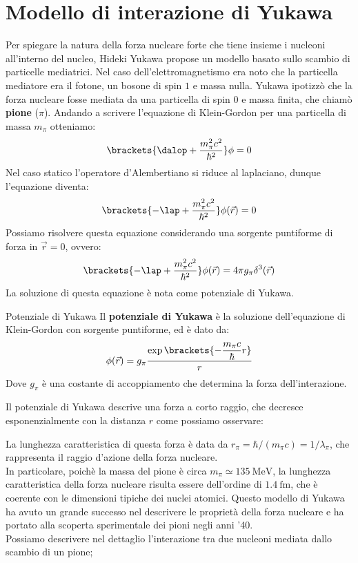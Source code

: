 \section{Modello di interazione di Yukawa}
Per spiegare la natura della forza nucleare forte che tiene insieme i nucleoni all'interno del nucleo, Hideki Yukawa propose un modello basato sullo scambio di particelle mediatrici. Nel caso dell'elettromagnetismo era noto che la particella mediatore era il fotone, un bosone di spin $1$ e massa nulla. Yukawa ipotizzò che la forza nucleare fosse mediata da una particella di spin $0$ e massa finita, che chiamò \textbf{pione} ($\pi$). Andando a scrivere l'equazione di Klein-Gordon per una particella di massa $m_{\pi}$ otteniamo:
\begin{equation}
    \brackets{\dalop + \dfrac{m_{\pi}^2 c^2}{\hbar^2}} \phi = 0
\end{equation}
Nel caso statico l'operatore d'Alembertiano si riduce al laplaciano, dunque l'equazione diventa:
\begin{equation}
    \brackets{-\lap + \dfrac{m_{\pi}^2 c^2}{\hbar^2}} \phi(\vec{r}) = 0
\end{equation}
Possiamo risolvere questa equazione considerando una sorgente puntiforme di forza in $\vec{r} = 0$, ovvero:
\begin{equation}
    \brackets{-\lap + \dfrac{m_{\pi}^2 c^2}{\hbar^2}} \phi(\vec{r}) = 4\pi g_{\pi}\delta^3(\vec{r})
\end{equation}
La soluzione di questa equazione è nota come potenziale di Yukawa.
\begin{definition}{Potenziale di Yukawa}
    Il \textbf{potenziale di Yukawa} è la soluzione dell'equazione di Klein-Gordon con sorgente puntiforme, ed è dato da:
    \begin{equation}
        \phi(\vec{r}) = g_{\pi} \dfrac{\exp\brackets{-\dfrac{m_{\pi} c}{\hbar} r}}{r}
    \end{equation}
    Dove $g_{\pi}$ è una costante di accoppiamento che determina la forza dell'interazione.
\end{definition}
Il potenziale di Yukawa descrive una forza a corto raggio, che decresce esponenzialmente con la distanza $r$ come possiamo osservare:


La lunghezza caratteristica di questa forza è data da $r_{\pi} = \hbar/(m_{\pi} c) = 1/\lambda_{\pi}$, che rappresenta il raggio d'azione della forza nucleare.\\
In particolare, poichè la massa del pione è circa $m_{\pi} \simeq \qty{135}{\mega\electronvolt}$, la lunghezza caratteristica della forza nucleare risulta essere dell'ordine di $\qty{1.4}{\femto\meter}$, che è coerente con le dimensioni tipiche dei nuclei atomici. Questo modello di Yukawa ha avuto un grande successo nel descrivere le proprietà della forza nucleare e ha portato alla scoperta sperimentale dei pioni negli anni '40.\\
Possiamo descrivere nel dettaglio l'interazione tra due nucleoni mediata dallo scambio di un pione;

